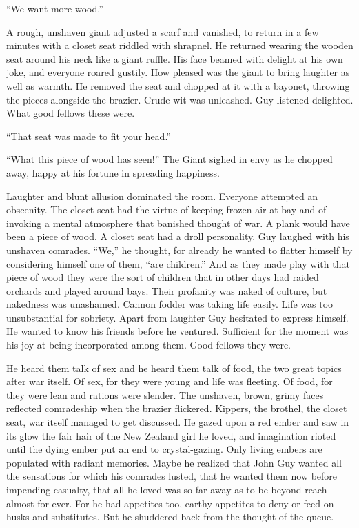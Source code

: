 ``We want more wood.''

A rough, unshaven giant adjusted a scarf and vanished, to return in a few minutes with a 
closet seat riddled with shrapnel. He returned wearing the wooden seat around his neck like 
a giant ruffle. His face beamed with delight at his own joke, and everyone roared gustily. 
How pleased was the giant to bring laughter as well as warmth. He removed the seat and 
chopped at it with a bayonet, throwing the pieces alongside the brazier. Crude wit was 
unleashed. Guy listened delighted. What good fellows these were.

``That seat was made to fit your head.''

``What this piece of wood has seen!'' The Giant sighed in envy as he chopped away, happy 
at his fortune in spreading happiness.

Laughter and blunt allusion dominated the room. Everyone attempted an obscenity. The closet 
seat had the virtue of keeping frozen air at bay and of invoking a mental atmosphere that 
banished thought of war. A plank would have been a piece of wood. A closet seat had a droll 
personality. Guy laughed with his unshaven comrades. ``We,'' he thought, for already he 
wanted to flatter himself by considering himself one of them, ``are children.'' And as 
they made play with that piece of wood they were the sort of children that in other days 
had raided orchards and played around bays. Their profanity was naked of culture, but 
nakedness was unashamed. Cannon fodder was taking life easily. Life was too unsubstantial 
for sobriety. Apart from laughter Guy hesitated to express himself. He wanted to know his friends 
before he ventured. Sufficient for the moment was his joy at being incorporated among them. 
Good fellows they were.

He heard them talk of sex and he heard them talk of food, the two great topics after war 
itself. Of sex, for they were young and life was fleeting. Of food, for they were lean and 
rations were slender. The unshaven, brown, grimy faces reflected comradeship when the brazier 
flickered. Kippers, the brothel, the closet seat, war itself managed to get discussed. He 
gazed upon a red ember and saw in its glow the fair hair of the New Zealand girl he loved, 
and imagination rioted until the dying ember put an end to crystal-gazing. Only living embers 
are populated with radiant memories. Maybe he realized that John Guy wanted all the sensations 
for which his comrades lusted, that he wanted them now before impending casualty, that all 
he loved was so far away as to be beyond reach almost for ever. For he had appetites too, 
earthy appetites to deny or feed on husks and substitutes. But he shuddered back from the 
thought of the queue.

